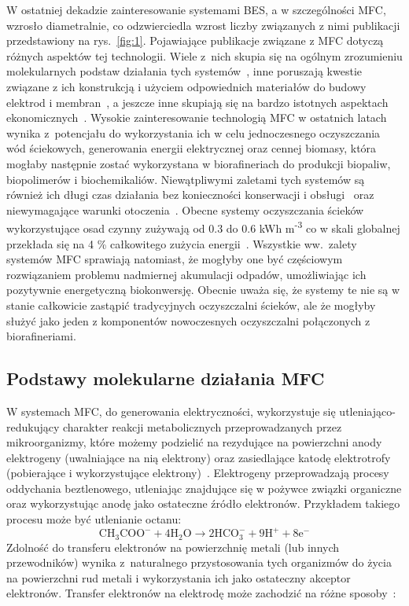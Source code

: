 W ostatniej dekadzie zainteresowanie systemami BES,
a w szczególności MFC, wzrosło diametralnie, co odzwierciedla wzrost
liczby związanych z nimi publikacji przedstawiony na rys.~\ref{fig:1}.
Pojawiające publikacje związane z MFC
dotyczą różnych aspektów tej technologii.
Wiele z~nich skupia się na ogólnym zrozumieniu molekularnych podstaw
działania tych systemów~\cite{Slate2019, Bruce2006, Lovley2006}, inne
poruszają kwestie związane z ich konstrukcją i użyciem odpowiednich
materiałów do budowy elektrod i membran~\cite{Kaur2020, Daud2015},
a jeszcze inne skupiają się na bardzo istotnych
aspektach ekonomicznych~\cite{Trapero2017}.
Wysokie zainteresowanie technologią MFC w ostatnich latach wynika
z~potencjału do wykorzystania ich w celu jednoczesnego oczyszczania
wód ściekowych, generowania energii elektrycznej oraz cennej biomasy,
która mogłaby następnie zostać wykorzystana w biorafineriach do produkcji
biopaliw, biopolimerów i biochemikaliów.
Niewątpliwymi zaletami tych systemów są również ich długi czas działania
bez konieczności konserwacji i obsługi~\cite{Habermann1991}
oraz niewymagające warunki otoczenia~\cite{Slate2019}.
Obecne systemy oczyszczania ścieków wykorzystujące osad czynny
zużywają od 0.3 do 0.6 kWh m\textsuperscript{-3} co w skali globalnej
przekłada się na 4 \% całkowitego zużycia energii~\cite{AlSayed2020}.
Wszystkie ww.\ zalety systemów MFC sprawiają natomiast, że mogłyby one
być częściowym rozwiązaniem problemu nadmiernej akumulacji odpadów,
umożliwiając ich pozytywnie energetyczną biokonwersję.
Obecnie uważa się, że systemy te nie są w stanie całkowicie zastąpić
tradycyjnych oczyszczalni ścieków, ale że mogłyby służyć
jako jeden z komponentów nowoczesnych oczyszczalni połączonych
z biorafineriami.

\subsection{Podstawy molekularne działania MFC}\label{subsec:podstawy-molekularne}
W systemach MFC, do generowania elektryczności, wykorzystuje się
utleniająco-redukujący charakter reakcji metabolicznych
przeprowadzanych przez mikroorganizmy, które możemy podzielić
na rezydujące na powierzchni anody elektrogeny (uwalniające na nią
elektrony) oraz zasiedlające katodę elektrotrofy
(pobierające i wykorzystujące elektrony)~\cite{AlSayed2020}.
Elektrogeny przeprowadzają procesy oddychania beztlenowego,
utleniając znajdujące się w pożywce związki organiczne oraz
wykorzystując anodę jako ostateczne źródło elektronów.
Przykładem takiego procesu może być utlenianie octanu:
\begin{equation}
    \label{eq:1}
    \mathrm{CH_3 COO^- + 4H_2 O \rightarrow 2HCO_3^- + 9H^+ + 8e^-}
\end{equation}
Zdolność do transferu elektronów na powierzchnię metali (lub
innych przewodników) wynika z~naturalnego przystosowania tych
organizmów do życia na powierzchni rud metali i wykorzystania
ich jako ostateczny akceptor elektronów.
Transfer elektronów na elektrodę może zachodzić na różne
sposoby~\cite{Santoro2017}:

